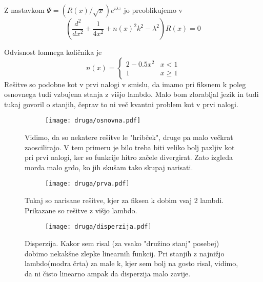 \documentclass{article}
\begin{document}
Z nastavkom $\Psi = (R(x)/\sqrt{x}) e^{i \lambda z}$ jo preoblikujemo v 
\begin{equation*}
\left(\frac{d^2}{dx^2} + \frac{1}{4x^2} + n(x)^2 k^2 - \lambda^2 \right) R(x) = 0
\end{equation*}

Odvisnost lomnega količnika je
\begin{equation*}
n(x) = \begin{cases}
2-0.5x^2 & x < 1 \\
1 & x \geq 1
\end{cases}
\end{equation*}
Rešitve so podobne kot v prvi nalogi v smislu, da imamo pri fiksnem k poleg osnovnega tudi vzbujena stanja z višjo lambdo. Malo bom zlorabljal jezik in tudi tukaj govoril o stanjih, čeprav to ni več kvantni problem kot v prvi nalogi.

\begin{figure}[H]
\centering
\begin{subfigure}{\textwidth}
\texttt{[image: druga/osnovna.pdf]}
\end{subfigure}
\caption*{Vidimo, da so nekatere rešitve le "hribček", druge pa malo večkrat zaoscilirajo. V tem primeru je bilo treba biti veliko bolj pazljiv kot pri prvi nalogi, ker so funkcije hitro začele divergirat. Zato izgleda morda malo grdo, ko jih skušam tako skupaj narisati.}
\end{figure}

\begin{figure}[H]
\centering
\begin{subfigure}{\textwidth}
\texttt{[image: druga/prva.pdf]}
\end{subfigure}
\caption*{Tukaj so narisane rešitve, kjer za fiksen k dobim vsaj 2 lambdi. Prikazane so rešitve z višjo lambdo.}
\end{figure}

\begin{figure}[H]
\centering
\begin{subfigure}{\textwidth}
\texttt{[image: druga/disperzija.pdf]}
\end{subfigure}
\caption*{Disperzija. Kakor sem risal (za vsako "družino stanj" posebej) dobimo nekakšne zlepke linearnih funkcij. Pri stanjih z najnižjo lambdo(modra črta) za male k, kjer sem bolj na gosto risal, vidimo, da ni čisto linearno ampak da disperzija malo zavije.}
\end{figure}
\end{document}
